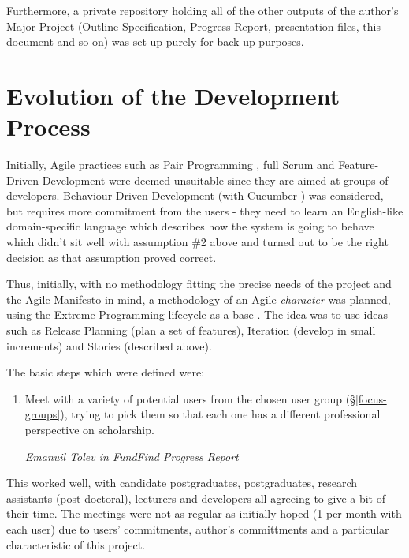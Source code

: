Furthermore, a private repository holding all of the other outputs of the author's Major Project (Outline Specification, Progress Report, presentation files, this document and so on) was set up purely for back-up purposes.

\section{Evolution of the Development Process}
Initially, Agile practices such as Pair Programming \cite{pairprg}, full Scrum \cite{Scrum} and Feature-Driven Development were deemed unsuitable since they are aimed at groups of developers. Behaviour-Driven Development (with Cucumber \cite{cucumber}) was considered, but requires more commitment from the users - they need to learn an English-like domain-specific language which describes how the system is going to behave which didn't sit well with assumption \#2 above and turned out to be the right decision as that assumption proved correct.

Thus, initially, with no methodology fitting the precise needs of the project and the Agile Manifesto \cite{agile-manifesto} in mind, a methodology of an Agile \emph{character} was planned, using the Extreme Programming lifecycle as a base \cite{xp-lifecycle}. The idea was to use ideas such as Release Planning (plan a set of features), Iteration (develop in small increments) and Stories (described above).

The basic steps which were defined were:
\begin{shadequote}
\begin{enumerate}
	\item Meet with a variety of potential users from the chosen user group (\S\ref{focus-groups}), trying to pick them so that each one has a different professional perspective on scholarship.
	\par\emph{Emanuil Tolev in FundFind Progress Report \cite{progress-report}}
	\setcounter{tmpc}{\theenumi}
\end{enumerate}
\end{shadequote}

This worked well, with candidate postgraduates, postgraduates, research assistants (post-doctoral), lecturers and developers all agreeing to give a bit of their time. The meetings were not as regular as initially hoped (1 per month with each user) due to users' commitments, author's committments and a particular characteristic of this project.

